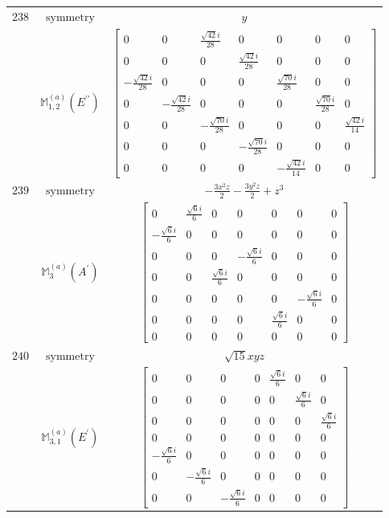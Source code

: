 \documentclass[fleqn,8pt,landscape]{jsarticle}
\begin{document}
\begin{longtable}{ccc}
$ 238 $ & $ \text{symmetry} $ & $ y $ \\
$  $ & $ \mathbb{M}_{1,2}^{(a)}(E^{\prime\prime}) $ & $ \begin{bmatrix} 0 & 0 & \frac{\sqrt{42} i}{28} & 0 & 0 & 0 & 0 \\ 0 & 0 & 0 & \frac{\sqrt{42} i}{28} & 0 & 0 & 0 \\ - \frac{\sqrt{42} i}{28} & 0 & 0 & 0 & \frac{\sqrt{70} i}{28} & 0 & 0 \\ 0 & - \frac{\sqrt{42} i}{28} & 0 & 0 & 0 & \frac{\sqrt{70} i}{28} & 0 \\ 0 & 0 & - \frac{\sqrt{70} i}{28} & 0 & 0 & 0 & \frac{\sqrt{42} i}{14} \\ 0 & 0 & 0 & - \frac{\sqrt{70} i}{28} & 0 & 0 & 0 \\ 0 & 0 & 0 & 0 & - \frac{\sqrt{42} i}{14} & 0 & 0 \end{bmatrix} $ \\ \hline
$ 239 $ & $ \text{symmetry} $ & $ - \frac{3 x^{2} z}{2} - \frac{3 y^{2} z}{2} + z^{3} $ \\
$  $ & $ \mathbb{M}_{3}^{(a)}(A^{\prime}) $ & $ \begin{bmatrix} 0 & \frac{\sqrt{6} i}{6} & 0 & 0 & 0 & 0 & 0 \\ - \frac{\sqrt{6} i}{6} & 0 & 0 & 0 & 0 & 0 & 0 \\ 0 & 0 & 0 & - \frac{\sqrt{6} i}{6} & 0 & 0 & 0 \\ 0 & 0 & \frac{\sqrt{6} i}{6} & 0 & 0 & 0 & 0 \\ 0 & 0 & 0 & 0 & 0 & - \frac{\sqrt{6} i}{6} & 0 \\ 0 & 0 & 0 & 0 & \frac{\sqrt{6} i}{6} & 0 & 0 \\ 0 & 0 & 0 & 0 & 0 & 0 & 0 \end{bmatrix} $ \\ \hline
$ 240 $ & $ \text{symmetry} $ & $ \sqrt{15} x y z $ \\
$  $ & $ \mathbb{M}_{3,1}^{(a)}(E^{\prime}) $ & $ \begin{bmatrix} 0 & 0 & 0 & 0 & \frac{\sqrt{6} i}{6} & 0 & 0 \\ 0 & 0 & 0 & 0 & 0 & \frac{\sqrt{6} i}{6} & 0 \\ 0 & 0 & 0 & 0 & 0 & 0 & \frac{\sqrt{6} i}{6} \\ 0 & 0 & 0 & 0 & 0 & 0 & 0 \\ - \frac{\sqrt{6} i}{6} & 0 & 0 & 0 & 0 & 0 & 0 \\ 0 & - \frac{\sqrt{6} i}{6} & 0 & 0 & 0 & 0 & 0 \\ 0 & 0 & - \frac{\sqrt{6} i}{6} & 0 & 0 & 0 & 0 \end{bmatrix} $ \\ \hline

\end{longtable}
\end{document}

